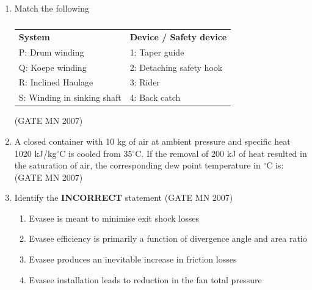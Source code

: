 \documentclass[journal]{IEEEtran}
\begin{document}
\begin{enumerate}
\item Match the following
\begin{table}[H]
    \centering\normalsize
\begin{tabular}{p{4.5cm} p{6cm}}
\textbf{System} & \textbf{Device / Safety device} \\
P: Drum winding & 1: Taper guide \\
Q: Koepe winding & 2: Detaching safety hook \\
R: Inclined Haulage & 3: Rider \\
S: Winding in sinking shaft & 4: Back catch \\
\end{tabular}
\caption*{}
    \label{tab:Q48}
\end{table}
\hfill (GATE MN 2007)
\begin{enumerate}
\end{enumerate}


\item A closed container with 10 kg of air at ambient pressure and specific heat 1020 kJ/kg$^\circ$C is cooled from 35$^\circ$C. If the removal of 200 kJ of heat resulted in the saturation of air, the corresponding dew point temperature in $^\circ$C is:
\hfill (GATE MN 2007)
\begin{enumerate}
\end{enumerate}


\item Identify the \textbf{INCORRECT} statement
\hfill (GATE MN 2007)
\begin{enumerate}
\item Evasee is meant to minimise exit shock losses
\item Evasee efficiency is primarily a function of divergence angle and area ratio
\item Evasee produces an inevitable increase in friction losses
\item Evasee installation leads to reduction in the fan total pressure
\end{enumerate}



\end{enumerate}
\end{document}
